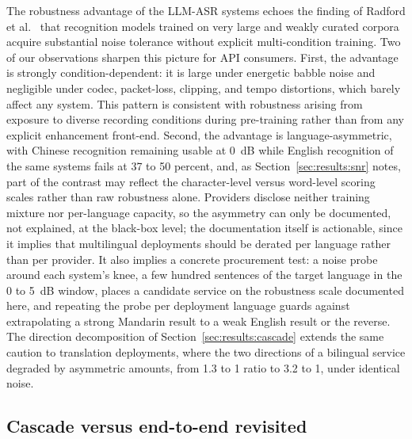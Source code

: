 The robustness advantage of the LLM-ASR systems echoes the finding of
Radford et al.~\cite{radford2023robust} that recognition models trained on
very large and weakly curated corpora acquire substantial noise tolerance
without explicit multi-condition training. Two of our observations sharpen
this picture for API consumers. First, the advantage is strongly
condition-dependent: it is large under energetic babble noise and negligible
under codec, packet-loss, clipping, and tempo distortions, which barely
affect any system. This pattern is consistent with robustness arising from
exposure to diverse recording conditions during pre-training rather than
from any explicit enhancement front-end. Second, the advantage is
language-asymmetric, with Chinese recognition remaining usable at 0~dB
while English recognition of the same systems fails at 37 to 50 percent,
and, as Section~\ref{sec:results:snr} notes, part of the contrast may
reflect the character-level versus word-level scoring scales rather than
raw robustness alone. Providers
disclose neither training mixture nor per-language capacity, so the asymmetry
can only be documented, not explained, at the black-box level; the
documentation itself is actionable, since it implies that multilingual
deployments should be derated per language rather than per provider. It also implies a concrete procurement test: a
noise probe around each system's knee, a few hundred sentences of the target
language in the 0 to 5~dB window, places a candidate service on the
robustness scale documented here, and repeating the probe per deployment
language guards against extrapolating a strong Mandarin result to a weak
English result or the reverse. The direction decomposition of
Section~\ref{sec:results:cascade} extends the same caution to translation
deployments, where the two directions of a bilingual service degraded by
asymmetric amounts, from 1.3 to 1 ratio to 3.2 to 1, under identical noise.

\subsection{Cascade versus end-to-end revisited}

